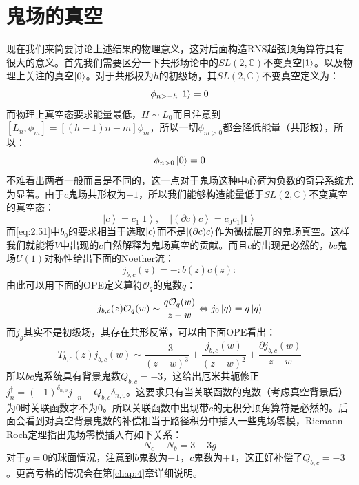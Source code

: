 \section{鬼场的真空}
现在我们来简要讨论上述结果的物理意义，这对后面构造RNS超弦顶角算符具有很大的意义。首先我们需要区分一下共形场论中的$SL(2,\mathbb{C})$不变真空$\ket{1}$。以及物理上关注的真空$\ket{0}$。对于共形权为$h$的初级场，其$SL(2,\mathbb{C})$不变真空定义为：
\begin{equation}
	\phi_{n>-h}\ket{1}=0
\end{equation}
而物理上真空态要求能量最低，$H\sim L_0$而且注意到$[L_n,\phi_m]=[(h-1)n-m]\phi_m$，所以一切$\phi_{m>0}$都会降低能量（共形权），所以：
\begin{equation}
	\phi_{n>0}\ket{0}=0
\end{equation}
不难看出两者一般而言是不同的，这一点对于鬼场这种中心荷为负数的奇异系统尤为显著。由于$c$鬼场共形权为$-1$，所以我们能够构造能量低于$SL(2,\mathbb{C})$不变真空的真空态：
\begin{equation}
	\label{eq:2.62}
	\left|c\right\rangle=c_{1}\left|1\right\rangle,\quad\left|(\partial c)c\right\rangle=c_{0}c_{1}\left|1\right\rangle
\end{equation}
而\ref{eq:2.51}中$b_0$的要求相当于选取$\ket{c}$而不是$\ket{(\partial c) c}$作为微扰展开的鬼场真空。这样我们就能将$V$中出现的$c$自然解释为鬼场真空的贡献。而且$c$的出现是必然的，$bc$鬼场$U(1)$对称性给出下面的Noether流：
\begin{equation}
	\label{eq:2.63}
	j_{b,c}(z)=-:b(z)c(z):
\end{equation}
由此可以用下面的OPE定义算符$\mathcal{O}_q$的鬼数$q$：
\begin{equation}
	j_{b,c}(z)\mathcal{O}_q(w)\sim\frac{q\mathcal{O}_q(w)}{z-w}\Leftrightarrow j_0\ket{q} = q\ket{q}
\end{equation}
而$j_g$其实不是初级场，其存在共形反常，可以由下面OPE看出：
\begin{equation}
	T_{b,c}(z)j_{b,c}(w)\sim\frac{-3}{(z-w)^3}+\frac{j_{b,c}(w)}{(z-w)^2}+\frac{\partial j_{b,c}(w)}{z-w}
\end{equation}
所以$bc$鬼系统具有背景鬼数$Q_{b,c}=-3$，这给出厄米共轭修正$j_n^\dagger=(-1)^{\delta_{n,0}}j_{-n}-Q_{b,c}\delta_{n,0}$。这要求只有当关联函数的鬼数（考虑真空背景后）为$0$时关联函数才不为$0$。所以关联函数中出现带$c$的无积分顶角算符是必然的。后面会看到对真空背景鬼数的补偿相当于路径积分中插入一些鬼场零模，Riemann-Roch定理指出鬼场零模插入有如下关系：
\begin{equation}
	\label{eq:2.66}
	N_c-N_b=3-3g
\end{equation}
对于$g=0$的球面情况，注意到$b$鬼数为$-1$，$c$鬼数为$+1$，这正好补偿了$Q_{b,c}=-3$。更高亏格的情况会在第\ref{chap:4}章详细说明。

